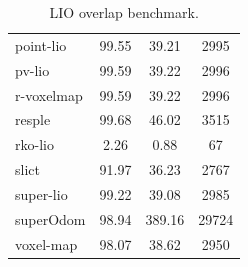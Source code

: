 \begin{table}[]
\begin{tabular}{lccc}
point-lio & 99.55 & 39.21 & 2995 \\
pv-lio & 99.59 & 39.22 & 2996 \\
r-voxelmap & 99.59 & 39.22 & 2996 \\
resple & 99.68 & 46.02 & 3515 \\
rko-lio & 2.26 & 0.88 & 67 \\
slict & 91.97 & 36.23 & 2767 \\
super-lio & 99.22 & 39.08 & 2985 \\
superOdom & 98.94 & 389.16 & 29724 \\
voxel-map & 98.07 & 38.62 & 2950 \\
\end{tabular}
\caption{LIO overlap benchmark.}
\label{tab:lio_overlap}
\end{table}